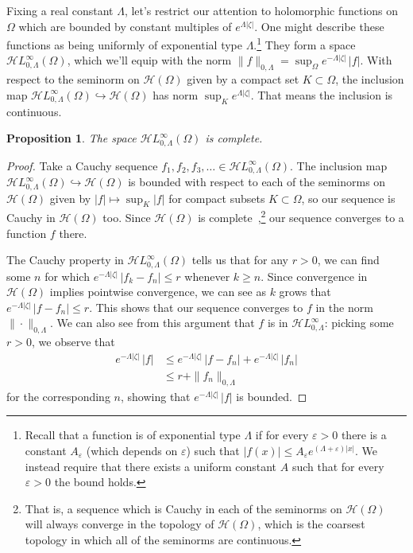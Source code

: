 \documentclass{article}
\theoremstyle{plain}
\newtheorem{prop}{Proposition}
\newcommand{\holo}{\mathcal{H}}
\newcommand{\singexp}[2]{\mathcal{H}L^\infty_{#1, #2}}
\begin{document}
Fixing a real constant $\Lambda$, let's restrict our attention to holomorphic functions on $\Omega$ which are bounded by constant multiples of $e^{\Lambda|\zeta|}$. One might describe these functions as being uniformly of exponential type $\Lambda$.\footnote{Recall that a function is of exponential type $\Lambda$ if for every $\varepsilon>0$ there is a constant $A_\varepsilon$ (which depends on $\varepsilon$) such that $|f(x)|\leq A_\varepsilon e^{(\Lambda+\varepsilon)|x|}$. We instead require that there exists a uniform constant $A$ such that for every $\varepsilon>0$ the bound holds.} They form a space $\singexp{0}{\Lambda}(\Omega)$, which we'll equip with the norm $\|f\|_{0,\Lambda} = \sup_\Omega e^{-\Lambda|\zeta|}\,|f|$. With respect to the seminorm on $\holo(\Omega)$ given by a compact set $K \subset \Omega$, the inclusion map $\singexp{0}{\Lambda}(\Omega) \hookrightarrow \holo(\Omega)$ has norm $\sup_K e^{\Lambda |\zeta|}$. That means the inclusion is continuous.
\begin{prop}\label{exp-complete}
The space $\singexp{0}{\Lambda}(\Omega)$ is complete.
\end{prop}
\begin{proof}
Take a Cauchy sequence $f_1, f_2, f_3, \ldots \in \singexp{0}{\Lambda}(\Omega)$. The inclusion map $\singexp{0}{\Lambda}(\Omega) \hookrightarrow \holo(\Omega)$ is bounded with respect to each of the seminorms on $\holo(\Omega)$ given by $|f| \mapsto \sup_K |f|$ for compact subsets $K \subset \Omega$, so our sequence is Cauchy in $\holo(\Omega)$ too. Since $\holo(\Omega)$ is complete~\cite[Proposition~3.5]{fnl-cpx-anal},\footnote{That is, a sequence which is Cauchy in each of the seminorms on $\holo(\Omega)$ will always converge in the topology of $\holo(\Omega)$, which is the coarsest topology in which all of the seminorms are continuous.} our sequence converges to a function $f$ there.

The Cauchy property in $\singexp{0}{\Lambda}(\Omega)$ tells us that for any $r > 0$, we can find some $n$ for which $e^{-\Lambda |\zeta|}\,|f_k - f_n| \le r$ whenever $k \ge n$. Since convergence in $\holo(\Omega)$ implies pointwise convergence, we can see as $k$ grows that $e^{-\Lambda |\zeta|}\,|f - f_n| \le r$. This shows that our sequence converges to $f$ in the norm $\|\cdot\|_{0,\Lambda}$. We can also see from this argument that $f$ is in $\singexp{0}{\Lambda}$: picking some $r > 0$, we observe that
\begin{align*}
e^{-\Lambda |\zeta|}\,|f| & \le e^{-\Lambda |\zeta|}\,|f - f_n| + e^{-\Lambda |\zeta|}\,|f_n| \\
& \le r + \|f_n\|_{0,\Lambda}
\end{align*}
for the corresponding $n$, showing that $e^{-\Lambda |\zeta|}\,|f|$ is bounded.
\end{proof}
\end{document}
